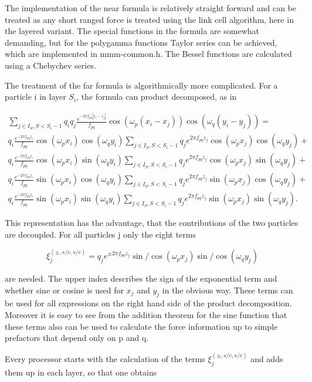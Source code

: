 The implementation of the near formula is relatively straight forward
and can be treated as any short ranged force is treated using the link
cell algorithm, here in the layered variant. The special functions in
the formula are somewhat demanding, but for the polygamma functions
Taylor series can be achieved, which are implemented in mmm-common.h.
The Bessel functions are calculated using a Chebychev series.

The treatment of the far formula is algorithmically more complicated.
For a particle i in layer $ S_i$, the formula can product decomposed,
as in

\[ \begin{array}{rl} \sum_{j\in I_S, S < S_i - 1} q_iq_j\frac{e^{-2\pi
      f_{pq}|z_i-z_j|}}{f_{pq}} \cos(\omega_p (x_i -
  x_j))\cos(\omega_q (y_i - y_j)) = \\
  q_i\frac{e^{-2\pi f_{pq}z_i}}{f_{pq}} \cos(\omega_p
  x_i)\cos(\omega_q y_i) \sum_{j\in I_S, S < S_i - 1}q_je^{2\pi
    f_{pq}z_j} \cos(\omega_p x_j)\cos(\omega_q y_j) + \\
  q_i\frac{e^{-2\pi f_{pq}z_i}}{f_{pq}} \cos(\omega_p
  x_i)\sin(\omega_q y_i) \sum_{j\in I_S, S < S_i - 1}q_je^{2\pi
    f_{pq}z_j} \cos(\omega_p x_j)\sin(\omega_q y_j) + \\
  q_i\frac{e^{-2\pi f_{pq}z_i}}{f_{pq}} \sin(\omega_p
  x_i)\cos(\omega_q y_i) \sum_{j\in I_S, S < S_i - 1}q_je^{2\pi
    f_{pq}z_j} \sin(\omega_p x_j)\cos(\omega_q y_j) + \\
  q_i\frac{e^{-2\pi f_{pq}z_i}}{f_{pq}} \sin(\omega_p
  x_i)\sin(\omega_q y_i) \sum_{j\in I_S, S < S_i - 1}q_je^{2\pi
    f_{pq}z_j} \sin(\omega_p x_j)\sin(\omega_q y_j). \end{array} \]

This representation has the advantage, that the contributions of the
two particles are decoupled. For all particles j only the eight terms

\[ \xi^{(\pm,s/c,s/c)}_j= q_je^{\pm 2\pi f_{pq}z_j} \sin/\cos(\omega_p
x_j)\sin/\cos(\omega_q y_j) \]

are needed. The upper index describes the sign of the exponential term
and whether sine or cosine is used for $x_j$ and $y_j$ in the obvious
way. These terms can be used for all expressions on the right hand
side of the product decomposition. Moreover it is easy to see from the
addition theorem for the sine function that these terms also can be
used to calculate the force information up to simple prefactors that
depend only on p and q.

Every processor starts with the calculation of the terms
$\xi^{(\pm,s/c,s/c)}_j$ and adds them up in each layer, so that one
obtains

